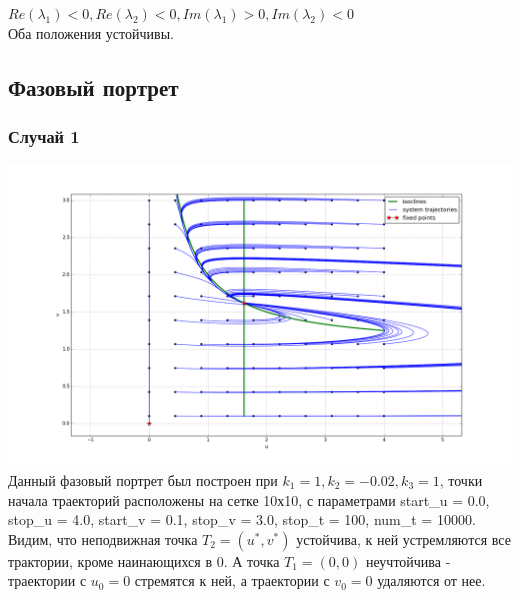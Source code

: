 \documentclass[oneside, final, 12pt]{article}
\begin{document}
\( Re(\lambda_1)<0, Re(\lambda_2)<0, Im(\lambda_1)>0, Im(\lambda_2)<0 \)\\

Оба положения устойчивы.\\

\subsection{Фазовый портрет}

\subsubsection{Случай 1}
\includegraphics[width=1\textwidth]{figure_2.png}\\
Данный фазовый портрет был построен при \(k_1 = 1,k_2 = -0.02,k_3 = 1\), точки начала траекторий расположены на сетке 10х10, с параметрами start_u = 0.0, stop_u = 4.0, start_v = 0.1, stop_v = 3.0, stop_t = 100, num_t = 10000.\\

Видим, что неподвижная точка \( T_2 = (u^*, v^*)\) устойчива, к ней устремляются все трактории, кроме наинающихся в 0. А точка \( T_1 = (0,0)\) неучтойчива - траектории с \(u_0 = 0\) стремятся к ней, а траектории с \(v_0 = 0\) удаляются от нее.
\end{document}
